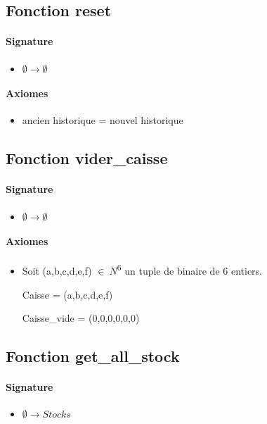 \documentclass[]{article}
\begin{document}
\subsection*{Fonction reset}
\paragraph{Signature}
\begin{itemize}
\item
  $  \emptyset \longrightarrow \emptyset $
\end{itemize}
\paragraph{Axiomes}
\begin{itemize}
\item
ancien historique = nouvel historique
\end{itemize}

\subsection*{Fonction vider\_caisse}
\paragraph{Signature}
\begin{itemize}
\item
  $  \emptyset \longrightarrow \emptyset$
\end{itemize}
\paragraph{Axiomes}
\begin{itemize}
\item
 Soit (a,b,c,d,e,f) \(\in \ N\)\textsuperscript{6} un tuple de
  binaire de 6 entiers.

Caisse = (a,b,c,d,e,f)

Caisse\_vide = (0,0,0,0,0,0)
\end{itemize}

\subsection*{Fonction get\_all\_stock}
\paragraph{Signature}
\begin{itemize}
\item
  $  \emptyset \longrightarrow Stocks$
\end{itemize}
\end{document}
